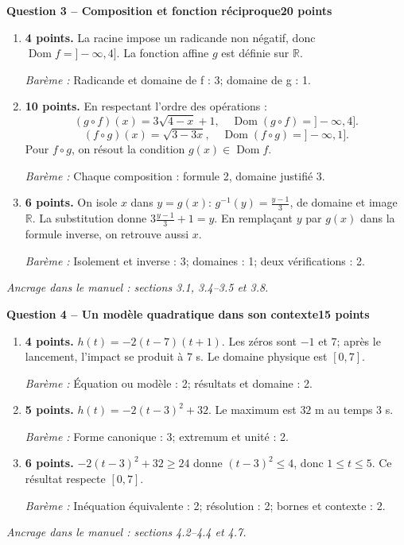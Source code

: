 \documentclass[11pt,a4paper]{article}
\begin{document}
\newpage
{\large\bfseries Question 3 -- Composition et fonction réciproque}\hfill\textbf{20 points}\par
\begin{enumerate}
\item \textbf{4 points.} La racine impose un radicande non négatif, donc \(\operatorname{Dom}f=]-\infty,4]\). La fonction affine \(g\) est définie sur \(\mathbb R\).
\par{\small\textit{Barème : }Radicande et domaine de f : 3; domaine de g : 1.}
\item \textbf{10 points.} En respectant l’ordre des opérations : \[(g\circ f)(x)=3\sqrt{4-x}+1,\quad \operatorname{Dom}(g\circ f)=]-\infty,4].\] \[(f\circ g)(x)=\sqrt{3-3x},\quad \operatorname{Dom}(f\circ g)=]-\infty,1].\] Pour \(f\circ g\), on résout la condition \(g(x)\in\operatorname{Dom}f\).
\par{\small\textit{Barème : }Chaque composition : formule 2, domaine justifié 3.}
\item \textbf{6 points.} On isole \(x\) dans \(y=g(x)\): \(g^{-1}(y)=\frac{y-1}{3}\), de domaine et image \(\mathbb R\). La substitution donne \(3\frac{y-1}{3}+1=y\). En remplaçant \(y\) par \(g(x)\) dans la formule inverse, on retrouve aussi \(x\).
\par{\small\textit{Barème : }Isolement et inverse : 3; domaines : 1; deux vérifications : 2.}
\end{enumerate}
\vfill {\small\textit{Ancrage dans le manuel : sections 3.1, 3.4--3.5 et 3.8.}}

\newpage
{\large\bfseries Question 4 -- Un modèle quadratique dans son contexte}\hfill\textbf{15 points}\par
\begin{enumerate}
\item \textbf{4 points.} \(h(t)=-2(t-7)(t+1)\). Les zéros sont \(-1\) et \(7\); après le lancement, l’impact se produit à \(7\) s. Le domaine physique est \([0,7]\).
\par{\small\textit{Barème : }Équation ou modèle : 2; résultats et domaine : 2.}
\item \textbf{5 points.} \(h(t)=-2(t-3)^2+32\). Le maximum est \(32\) m au temps \(3\) s.
\par{\small\textit{Barème : }Forme canonique : 3; extremum et unité : 2.}
\item \textbf{6 points.} \(-2(t-3)^2+32\ge24\) donne \((t-3)^2\le4\), donc \(1\le t\le5\). Ce résultat respecte \([0,7]\).
\par{\small\textit{Barème : }Inéquation équivalente : 2; résolution : 2; bornes et contexte : 2.}
\end{enumerate}
\vfill {\small\textit{Ancrage dans le manuel : sections 4.2--4.4 et 4.7.}}
\end{document}
